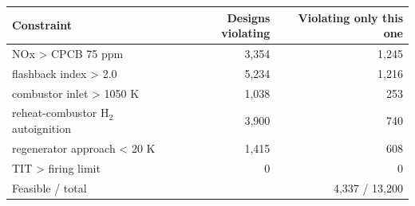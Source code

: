 \begin{tabular}{lrr}\toprule Constraint & Designs violating & Violating only this one\\\midrule
NOx > CPCB 75 ppm & 3,354 & 1,245\\
flashback index > 2.0 & 5,234 & 1,216\\
combustor inlet > 1050 K & 1,038 & 253\\
reheat-combustor H$_2$ autoignition & 3,900 & 740\\
regenerator approach < 20 K & 1,415 & 608\\
TIT > firing limit & 0 & 0\\
\midrule Feasible / total & \multicolumn{2}{r}{4,337 / 13,200}\\
\bottomrule\end{tabular}